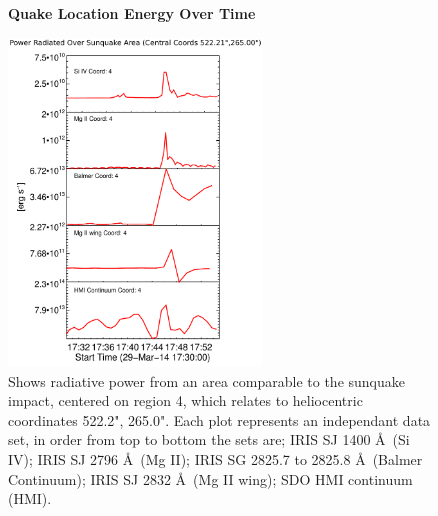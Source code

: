 \begin{figure}[H]
  \begin{center}
  \textbf{Quake Location Energy Over Time}\par\medskip
  \includegraphics[width=0.6\textwidth]{29-Mar-14-Ribbon-Area-4-Sunquake-Area-Power-Ladder}
  \end{center}
  \caption{Shows radiative power from an area comparable to the sunquake impact, centered on region 4, which relates to heliocentric coordinates 522.2", 265.0". Each plot represents an independant data set, in order from top to bottom the sets are; IRIS SJ 1400 \AA\ (Si IV); IRIS SJ 2796 \AA\ (Mg II); IRIS SG  2825.7 to 2825.8 \AA\ (Balmer Continuum); IRIS SJ 2832 \AA\ (Mg II wing); SDO HMI continuum (HMI).}\label{plot4}
\end{figure}

